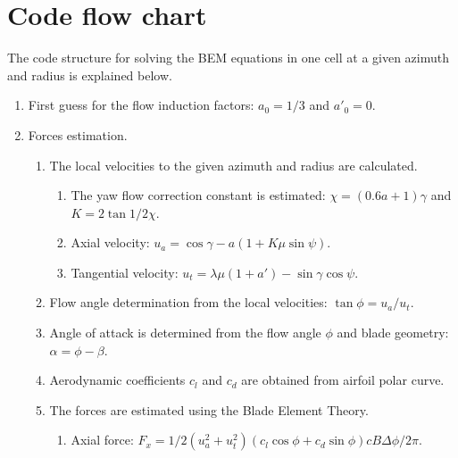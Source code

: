 \section{Code flow chart}

The code structure for solving the BEM equations in one cell at a given azimuth and radius is explained below.

\begin{enumerate}
	
	\item First guess for the flow induction factors: $ a_0 = 1/3 $ and $ a'_0 = 0 $.
	
	\item \label{iteration-start} Forces estimation.
	
	\begin{enumerate}
		
		\item The local velocities to the given azimuth and radius are calculated.
		
		\begin{enumerate}
			
			\item The yaw flow correction constant is estimated: $ \chi = (0.6 a + 1) \gamma $ and $ K = 2 \tan 1/2 \chi $.
			
			\item Axial velocity: $ u_a = \cos \gamma - a (1 + K \mu \sin \psi) $.
			
			\item Tangential velocity: $ u_t = \lambda \mu (1+a') - \sin \gamma \cos \psi $.
			
		\end{enumerate}
		
		\item Flow angle determination from the local velocities: $ \tan \phi = u_a/u_t $.
		
		\item Angle of attack is determined from the flow angle $ \phi $ and blade geometry: $ \alpha = \phi - \beta $.
		
		\item Aerodynamic coefficients $ c_l $ and $ c_d $ are obtained from airfoil polar curve.
		
		\item The forces are estimated using the Blade Element Theory.
		
		\begin{enumerate}
			
			\item Axial force: $ F_x = 1/2 (u_a^2+u_t^2) (c_l \cos \phi + c_d \sin \phi) c B \Delta \phi / 2 \pi $.
			

\end{enumerate}
\end{enumerate}
\end{enumerate}
